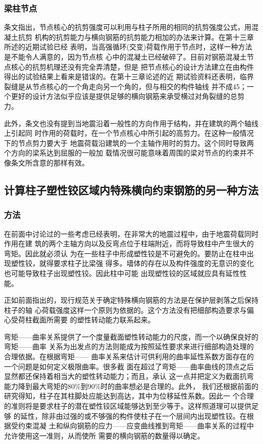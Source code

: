 \documentclass[12pt,a4paper]{book}
\begin{document}
\subsubsection{梁柱节点}

条文指出，节点核心的抗剪强度可以利用与柱子所用的相同的抗剪强度公式，用混凝土抗剪
机构的抗剪能力与横向钢筋的抗剪能力相加的办法来计算。在第十三章所述的近期试验已经
表明，当高强循环(交变)荷载作用于节点时，这样一种方法是不能令人满意的，因为节点核
心中的混凝土已经破碎了。目前对钢筋混凝土节点核心的抗剪机理还没有完全弄清楚，但是
把节点核心的设计方法建立在由构件得出的试验结果上看来是错误的。在第十三章论述的近
期试验资料还表明，临界裂缝是从节点核心的一个角走向另一个角的，但与相交的构件轴线
并不成45；一个更好的设计方法似乎应该是提供足够的横向钢筋来承受横过对角裂缝的总剪
力。

此外，条文也没有提到当地震沿着一般性的方向作用于结构，并在建筑的两个轴线上引起同
时作用的荷载时，在一个节点核心中所引起的高剪力。在这种一般情况下的节点剪力要大于
地震荷载沿建筑的一个主轴作用时的剪力。这个同时导致两个方向的梁系达到屈服的一般加
载情况很可能意味着周围的梁对节点的约束并不像条文所含意的那样有效。

\subsection{计算柱子塑性铰区域内特殊横向约束钢筋的另一种方法}

\subsubsection{方法}

在前面中讨论过的一些考虑已经表明，在非常大的地震过程中，由于地震荷载同时作用在建
筑的两个主轴方向以及反弯点位于柱端附近，而将导致柱中产生很大的弯矩。因此就必须认
为在一些柱子中形成塑性铰是不可避免的。要防止在柱中出现塑性铰，就得要求柱子比梁强
得多。墙体的存在以及构件强度的无意识的变化也可能导致柱子出现塑性铰。因此柱中可能
出现塑性铰的区域就应具有延性性能。

正如前面指出的，现行规范关于确定特殊横向钢筋的方法是在保护层剥落之后保持柱子的轴
心荷载强度这样一个原则为依据的。这个方法没有把细部构造要求与偏心受荷柱截面所需要
的塑性转动能力联系起来。

弯矩——曲率关系提供了一个度量截面塑性转动能力的尺度，而一个以确保良好的弯矩——曲率
关系为出发点的方法则能成为按照延性要求来进行细部构造处理的合理依据。在根据弯矩——
曲率关系来估计可供利用的曲率延性系数方面存在的一个问题是如何定义极限曲率。很多截
面在超过了弯矩——曲率曲线的顶点之后显然都还保持着相当大的塑性转动能力；而且，承认
这一点并把定义为截面抗弯能力降到最大弯矩的80\%到90\%时的曲率想必是合理的。此外，
我们还根据前面的研究得知，柱子在其柱脚处应能达到高达，其中为位移延性系数。因此一
个合理的准则将是要求柱子的潜在塑性铰区域能够达到至少等于。这样照道理可以提供足够
的延性，除非由过强的或不够强的构件使柱子在一个层间内出现塑性铰。在根据受约束混凝
土和纵向钢筋的应力——应变曲线推到弯矩——曲率关系的过程中允许使用这一准则，从而使所
需要的横向钢筋的数量得以确定。
\end{document}
